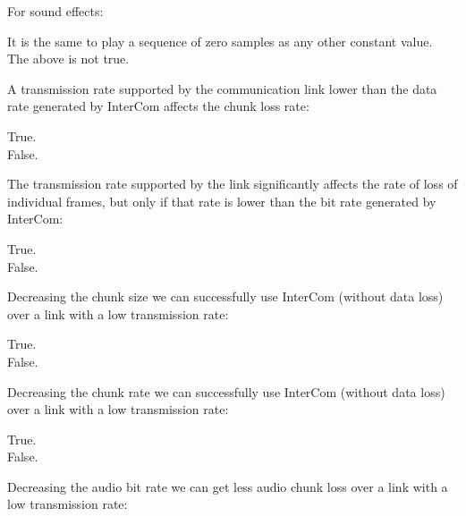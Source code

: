 \documentclass[legalpaper, 12pt, addpoints]{exam}
\begin{document}
\begin{questions}
\question For sound effects:

\begin{oneparchoices}
  \choice It is the same to play a sequence of zero samples as any other constant value.\\
  \choice The above is not true.
\end{oneparchoices}

\vspace{0.10in}

\question A transmission rate supported by the communication link lower than the data rate generated by InterCom affects the chunk loss rate:

\begin{oneparchoices}
  \choice True.\\
  \choice False.
\end{oneparchoices}

\vspace{0.10in}

\question The transmission rate supported by the link significantly affects the rate of loss of individual frames, but only if that rate is lower than the bit rate generated by InterCom:

\begin{oneparchoices}
  \choice True.\\
  \choice False.
\end{oneparchoices}

\vspace{0.10in}

\question Decreasing the chunk size we can successfully use InterCom (without data loss) over a link with a low transmission rate:

\begin{oneparchoices}
  \choice True.\\
  \choice False.
\end{oneparchoices}

\vspace{0.10in}

\question Decreasing the chunk rate we can successfully use InterCom (without data loss) over a link with a low transmission rate:

\begin{oneparchoices}
  \choice True.\\
  \choice False.
\end{oneparchoices}

\vspace{0.10in}

\question Decreasing the audio bit rate we can get less audio chunk loss over a link with a low transmission rate:


\end{questions}
\end{document}

